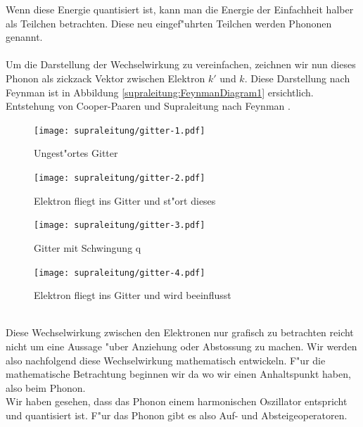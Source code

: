 \begin{refsection}
Wenn diese Energie quantisiert ist, kann man die Energie der Einfachheit halber als Teilchen betrachten.
Diese neu eingef"uhrten Teilchen werden Phononen genannt.
\\
\\
Um die Darstellung der Wechselwirkung zu vereinfachen, zeichnen wir nun dieses Phonon als zickzack Vektor zwischen Elektron $k'$ und $k$. Diese Darstellung nach Feynman ist in Abbildung \ref{supraleitung:FeynmanDiagram1} ersichtlich.
\\

Entstehung von Cooper-Paaren und Supraleitung nach Feynman
\cite{supraleitung:feynman}.
\begin{figure}
\centering
\texttt{[image: supraleitung/gitter-1.pdf]} %
\caption{Ungest"ortes Gitter
\label{supraleitung:Gitter1}}
\end{figure}
\begin{figure}
\centering
\texttt{[image: supraleitung/gitter-2.pdf]} %
\caption{Elektron fliegt ins Gitter und st"ort dieses
\label{supraleitung:Gitter2}}
\end{figure}
\begin{figure}
\centering
\texttt{[image: supraleitung/gitter-3.pdf]} %
\caption{Gitter mit Schwingung q
\label{supraleitung:Gitter3}}
\end{figure}
\begin{figure}
\centering
\texttt{[image: supraleitung/gitter-4.pdf]} %
\caption{Elektron fliegt ins Gitter und wird beeinflusst
\label{supraleitung:Gitter4}}
\end{figure}
\\
Diese Wechselwirkung zwischen den Elektronen nur grafisch zu betrachten reicht nicht um eine Aussage "uber Anziehung oder Abstossung zu machen.
Wir werden also nachfolgend diese Wechselwirkung mathematisch entwickeln.
F"ur die mathematische Betrachtung beginnen wir da wo wir einen Anhaltspunkt haben, also beim Phonon.
\\
Wir haben gesehen, dass das Phonon einem harmonischen Oszillator entspricht und quantisiert ist.
F"ur das Phonon gibt es also Auf- und Absteigeoperatoren.

\end{refsection}
